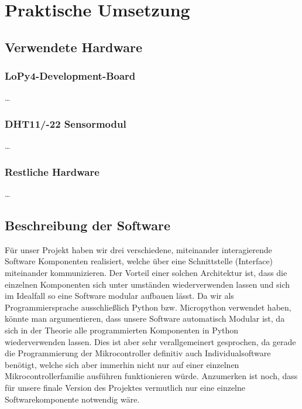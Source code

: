
\chapter{Praktische Umsetzung} \label{Praktische Umsetzung}
\section{Verwendete Hardware} \label{Hardware}
\subsection{LoPy4-Development-Board} \label{LoPy4}

\ldots

\subsection{DHT11/-22 Sensormodul} \label{DHT}

\ldots


\subsection{Restliche Hardware} \label{Restliche Hardware}

\ldots


\section{Beschreibung der Software} \label{Software}

Für unser Projekt haben wir drei verschiedene, miteinander interagierende Software Komponenten realisiert, welche über eine Schnittstelle (Interface) miteinander kommunizieren. 
Der Vorteil einer solchen Architektur ist, dass die einzelnen Komponenten sich unter umständen wiederverwenden lassen und sich im Idealfall so eine Software modular aufbauen lässt.
Da wir als Programmiersprache ausschließlich Python bzw. Micropython verwendet haben, könnte man argumentieren, dass unsere Software automatisch Modular ist, da sich in der Theorie alle programmierten Komponenten in Python wiederverwenden lassen.
Dies ist aber sehr verallgemeinert gesprochen, da gerade die Programmierung der Mikrocontroller definitiv auch Individualsoftware benötigt, welche sich aber immerhin nicht nur auf einer einzelnen Mikrocontrollerfamilie ausführen funktionieren würde.
Anzumerken ist noch, dass für unsere finale Version des Projektes vermutlich nur eine einzelne Softwarekomponente notwendig wäre.


